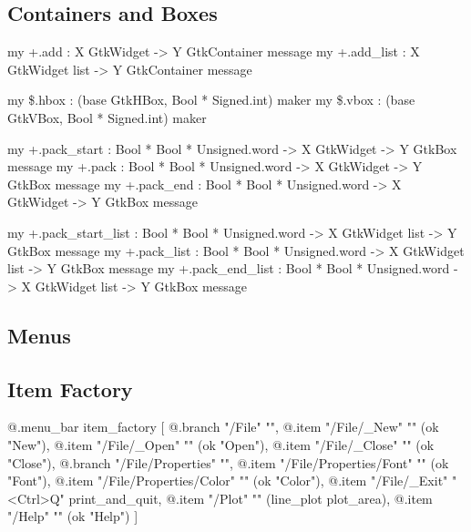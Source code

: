 \documentclass{article}
\begin{document}
\subsection{Containers and Boxes}

\begin{smldisp}
   my +.add      : X GtkWidget -> Y GtkContainer message
   my +.add_list : X GtkWidget list -> Y GtkContainer message
\end{smldisp}

\begin{smldisp}
   my \$.hbox : (base GtkHBox, Bool * Signed.int) maker
   my \$.vbox : (base GtkVBox, Bool * Signed.int) maker
\end{smldisp}

\begin{smldisp}
   my +.pack_start : Bool * Bool * Unsigned.word -> 
                        X GtkWidget -> Y GtkBox message
   my +.pack       : Bool * Bool * Unsigned.word -> 
                        X GtkWidget -> Y GtkBox message
   my +.pack_end   : Bool * Bool * Unsigned.word -> 
                        X GtkWidget -> Y GtkBox message
\end{smldisp}

\begin{smldisp}
   my +.pack_start_list : 
         Bool * Bool * Unsigned.word -> X GtkWidget list -> Y GtkBox message
   my +.pack_list : 
         Bool * Bool * Unsigned.word -> X GtkWidget list -> Y GtkBox message
   my +.pack_end_list : 
         Bool * Bool * Unsigned.word -> X GtkWidget list -> Y GtkBox message
\end{smldisp}

\subsection{Menus}

\subsection{Item Factory}

\begin{smldisp}
   @.menu_bar item_factory
   [ @.branch "/File" "",
       @.item "/File/_New" "" (ok "New"),
       @.item "/File/_Open" "" (ok "Open"),
       @.item "/File/_Close" "" (ok "Close"),
       @.branch "/File/Properties" "",
         @.item "/File/Properties/Font" "" (ok "Font"),
         @.item "/File/Properties/Color" "" (ok "Color"),
         @.item "/File/_Exit" "<Ctrl>Q" print_and_quit,
     @.item "/Plot" "" (line_plot plot_area),
     @.item "/Help" "" (ok "Help")
   ]
\end{smldisp}
\end{document}
